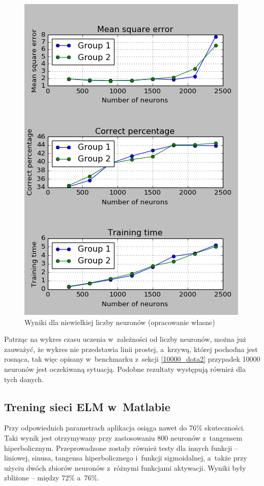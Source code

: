 \documentclass[pl]{minipw} %
\begin{document}
\begin{figure}[H]
\centering
\includegraphics[width=\textwidth]{wyniki_forest_python.png}
\caption[Wyniki dla niewielkiej liczby neuronów]{Wyniki dla niewielkiej liczby neuronów (opracowanie własne)}
\label{forest_python}
\end{figure}
Patrząc na wykres czasu uczenia w~zależności od liczby neuronów, można już zauważyć, że wykres nie przedstawia linii prostej, a~krzywą, której pochodna jest rosnąca, tak więc opisany w~benchmarku z~sekcji \ref{10000_dota2} przypadek 10000 neuronów jest oczekiwaną sytuacją. Podobne rezultaty występują również dla tych danych.
\subsection{Trening sieci ELM w~Matlabie}
Przy odpowiednich parametrach aplikacja osiąga nawet do 76\% skuteczności. 
Taki wynik jest otrzymywany przy zastosowaniu 800 neuronów z~tangensem hiperbolicznym.
Przeprowadzone zostały również testy dla innych funkcji -- liniowej, sinusa, tangensa hiperbolicznego i~funkcji sigmoidalnej, a~także przy użyciu dwóch zbiorów neuronów z~różnymi funkcjami aktywacji.
Wyniki były zbliżone -- między 72\% a~76\%.
\end{document}
